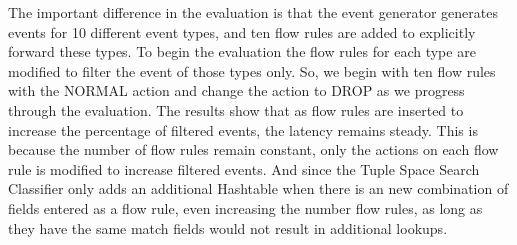  The important difference in the evaluation is that the event generator generates events for 10 different event types, and ten flow rules are added to explicitly forward these types. To begin the evaluation the flow rules for each type are modified to filter the event of those types only. So, we begin with ten flow rules with the NORMAL action and change the action to DROP as we progress through the evaluation. The results show that as flow rules are inserted to increase the percentage of filtered events, the latency remains steady. This is because the number of flow rules remain constant, only the actions on each flow rule is modified to increase filtered events. And since the Tuple Space Search Classifier only adds an additional Hashtable when there is an new combination of fields entered as a flow rule, even increasing the number flow rules, as long as they have the same match fields would not result in additional lookups.

